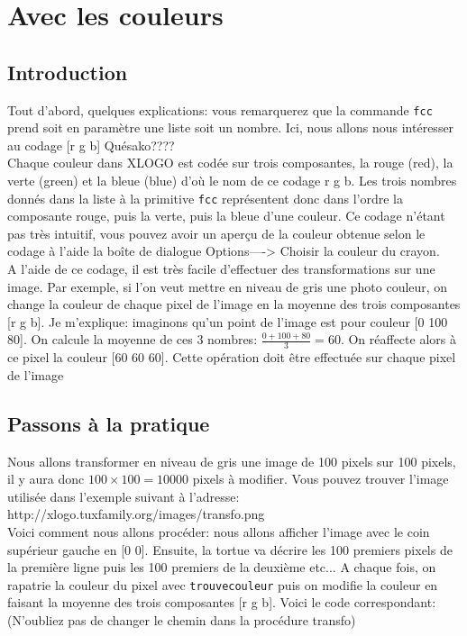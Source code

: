 \section{Avec les couleurs}
\subsection{Introduction}
Tout d'abord, quelques explications: vous remarquerez que la commande \texttt{fcc} prend soit en paramètre une liste soit un nombre. Ici, nous allons nous intéresser au codage [r g b] Quésako????\\
Chaque couleur dans XLOGO est codée sur trois composantes, la rouge (red), la verte (green) et la bleue (blue) d'où le nom de ce codage r g b. Les trois nombres donnés dans la liste à la primitive \texttt{fcc} représentent donc dans l'ordre la composante rouge, puis la verte, puis la bleue d'une couleur. Ce codage n'étant pas très intuitif, vous pouvez avoir un aperçu de la couleur obtenue selon le codage à l'aide la boîte de dialogue Options----> Choisir la couleur du crayon.\\
A l'aide de ce codage, il est très facile d'effectuer des transformations sur une image. Par exemple, si l'on veut mettre en niveau de gris une photo couleur, on change la couleur de chaque pixel de l'image en la moyenne des trois composantes [r g b]. Je m'explique: imaginons qu'un point de l'image est pour couleur [0 100 80]. On calcule la moyenne de  ces 3 nombres: $\frac{0+100+80}{3}=60$. On réaffecte alors à ce pixel la couleur [60 60 60]. Cette opération doit être effectuée sur chaque pixel de l'image
\subsection{Passons à la pratique}
Nous allons transformer en niveau de gris une image de 100 pixels sur 100 pixels, il y aura donc $100\times100=10000$ pixels à modifier. Vous pouvez trouver l'image utilisée dans l'exemple suivant à l'adresse: \\
http://xlogo.tuxfamily.org/images/transfo.png\\
Voici comment nous allons procéder: nous allons afficher l'image avec le coin supérieur gauche en [0 0]. Ensuite, la tortue va décrire les 100 premiers pixels de la première ligne puis les 100 premiers de la deuxième etc... A chaque fois, on rapatrie la couleur du pixel avec \texttt{trouvecouleur} puis on modifie la couleur en faisant la moyenne des trois composantes [r g b]. Voici le code correspondant:\\
(N'oubliez pas de changer le chemin dans la procédure transfo)

